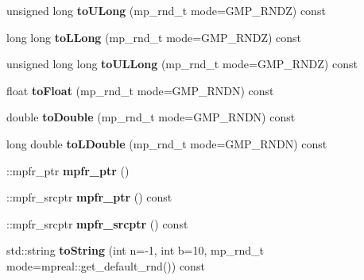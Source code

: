 \begin{DoxyCompactItemize}
unsigned long {\bfseries to\+U\+Long} (mp\+\_\+rnd\+\_\+t mode=G\+M\+P\+\_\+\+R\+N\+DZ) const
\item 
\mbox{\label{classmpfr_1_1mpreal_aa59c1e2a2ae1ebffc2bf21a13bd55638}} 
long long {\bfseries to\+L\+Long} (mp\+\_\+rnd\+\_\+t mode=G\+M\+P\+\_\+\+R\+N\+DZ) const
\item 
\mbox{\label{classmpfr_1_1mpreal_acbda71ccfc35989a61ef7811262430d0}} 
unsigned long long {\bfseries to\+U\+L\+Long} (mp\+\_\+rnd\+\_\+t mode=G\+M\+P\+\_\+\+R\+N\+DZ) const
\item 
\mbox{\label{classmpfr_1_1mpreal_a65701dfcda1e63a744cca47fa979ed29}} 
float {\bfseries to\+Float} (mp\+\_\+rnd\+\_\+t mode=G\+M\+P\+\_\+\+R\+N\+DN) const
\item 
\mbox{\label{classmpfr_1_1mpreal_a392fec4ce0f7ee156acf9a344b81c68f}} 
double {\bfseries to\+Double} (mp\+\_\+rnd\+\_\+t mode=G\+M\+P\+\_\+\+R\+N\+DN) const
\item 
\mbox{\label{classmpfr_1_1mpreal_a4dea97c2ce362d9f4cbe49cbce792ca7}} 
long double {\bfseries to\+L\+Double} (mp\+\_\+rnd\+\_\+t mode=G\+M\+P\+\_\+\+R\+N\+DN) const
\item 
\mbox{\label{classmpfr_1_1mpreal_af4e3b56888463376c675cac70b6ceca3}} 
\+::mpfr\+\_\+ptr {\bfseries mpfr\+\_\+ptr} ()
\item 
\mbox{\label{classmpfr_1_1mpreal_a6104e75a5ea71eea53340ed97963423e}} 
\+::mpfr\+\_\+srcptr {\bfseries mpfr\+\_\+ptr} () const
\item 
\mbox{\label{classmpfr_1_1mpreal_a566f64ca066c54923d19c11d6c3d15cd}} 
\+::mpfr\+\_\+srcptr {\bfseries mpfr\+\_\+srcptr} () const
\item 
\mbox{\label{classmpfr_1_1mpreal_ae4aae5f6374f94dbad8152cad907be01}} 
std\+::string {\bfseries to\+String} (int n=-\/1, int b=10, mp\+\_\+rnd\+\_\+t mode=mpreal\+::get\+\_\+default\+\_\+rnd()) const
\item 
\mbox{\label{classmpfr_1_1mpreal_a2fae3d876f85d4d04bd2ea606b5ccbb6}} 

\end{DoxyCompactItemize}
